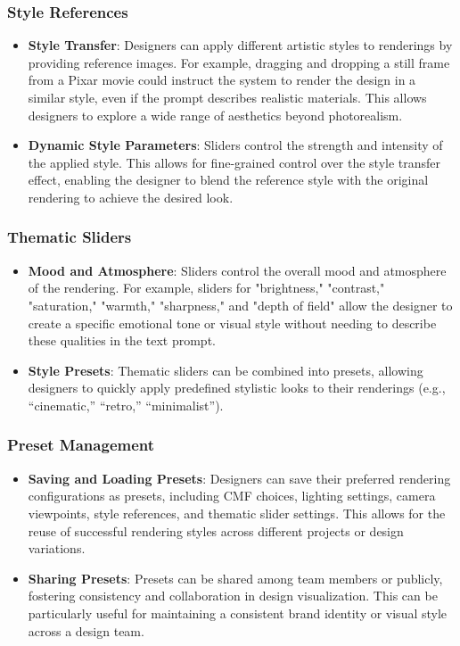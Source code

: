 \documentclass{article}
\begin{document}
\subsubsection{Style References}
\begin{itemize}
\item \textbf{Style Transfer}: Designers can apply different artistic styles to renderings by providing reference images. For example, dragging and dropping a still frame from a Pixar movie could instruct the system to render the design in a similar style, even if the prompt describes realistic materials. This allows designers to explore a wide range of aesthetics beyond photorealism.
\item \textbf{Dynamic Style Parameters}: Sliders control the strength and intensity of the applied style. This allows for fine-grained control over the style transfer effect, enabling the designer to blend the reference style with the original rendering to achieve the desired look.
\end{itemize}

\subsubsection{Thematic Sliders}
\begin{itemize}
\item \textbf{Mood and Atmosphere}: Sliders control the overall mood and atmosphere of the rendering. For example, sliders for "brightness," "contrast," "saturation," "warmth," "sharpness," and "depth of field" allow the designer to create a specific emotional tone or visual style without needing to describe these qualities in the text prompt.
\item \textbf{Style Presets}: Thematic sliders can be combined into presets, allowing designers to quickly apply predefined stylistic looks to their renderings (e.g., “cinematic,” “retro,” “minimalist”).
\end{itemize}

\subsubsection{Preset Management}
\begin{itemize}
\item \textbf{Saving and Loading Presets}: Designers can save their preferred rendering configurations as presets, including CMF choices, lighting settings, camera viewpoints, style references, and thematic slider settings. This allows for the reuse of successful rendering styles across different projects or design variations.
\item \textbf{Sharing Presets}: Presets can be shared among team members or publicly, fostering consistency and collaboration in design visualization. This can be particularly useful for maintaining a consistent brand identity or visual style across a design team.
\end{itemize}
\end{document}
